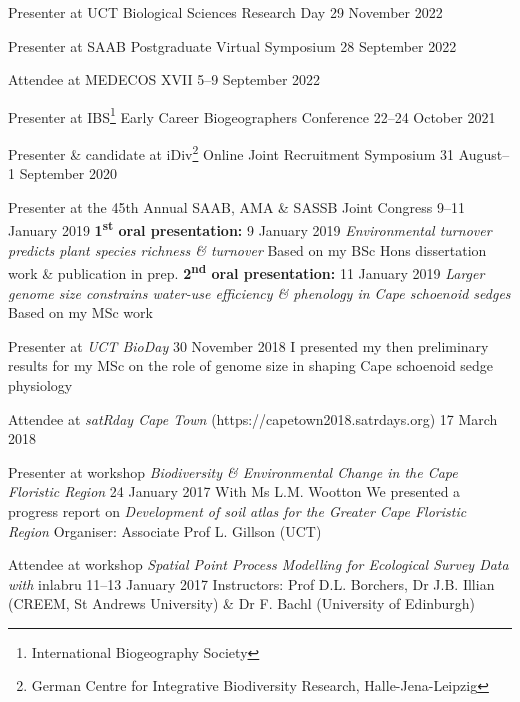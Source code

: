 \documentclass[10pt]{article}
\begin{document}
\begin{hangparas}{2em}{1}

Presenter at UCT Biological Sciences Research Day        \hfill 29 November 2022

Presenter at SAAB Postgraduate Virtual Symposium        \hfill 28 September 2022

Attendee at MEDECOS XVII                              \hfill 5--9 September 2022

Presenter at IBS\footnote{International Biogeography Society}
Early Career Biogeographers Conference                \hfill 22--24 October 2021

Presenter \& candidate at iDiv\footnote{German Centre for Integrative
Biodiversity Research, Halle-Jena-Leipzig} Online Joint Recruitment Symposium
                              \hfill 31 August--1 September 2020

Presenter at the 45th Annual SAAB, AMA \& SASSB Joint Congress
                                       \hfill 9--11 January 2019 \break
\textbf{1\textsuperscript{st} oral presentation:}
                                           \hfill 9 January 2019 \break
\textit{Environmental turnover predicts plant species richness \& turnover}
\break
Based on my BSc Hons dissertation work \& publication in prep. \break
\textbf{2\textsuperscript{nd} oral presentation:}
                                          \hfill 11 January 2019 \break
\textit{Larger genome size constrains water-use efficiency \& phenology in 
Cape schoenoid sedges} \break
Based on my MSc work

Presenter at \textit{UCT BioDay}         \hfill 30 November 2018 \break
I presented my then preliminary results for my MSc on the role of genome size in 
shaping Cape schoenoid sedge physiology

Attendee at \textit{satRday Cape Town} (https://capetown2018.satrdays.org)
                                                   \hfill 17 March 2018

Presenter at workshop \textit{Biodiversity \& Environmental Change in the Cape 
Floristic Region}                         \hfill 24 January 2017 \break
With Ms L.M. Wootton \break
We presented a progress report on \textit{Development of soil atlas for the 
Greater Cape Floristic Region} \break
Organiser: Associate Prof L. Gillson (UCT)

Attendee at workshop \textit{Spatial Point Process Modelling for Ecological 
Survey Data with} inlabru             \hfill 11--13 January 2017 \break
Instructors: Prof D.L. Borchers, Dr J.B. Illian (CREEM, St Andrews University) 
\& Dr F. Bachl (University of Edinburgh)

\hfill

\end{hangparas}
\end{document}
